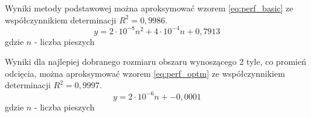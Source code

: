 \documentclass{article}
\begin{document}
 Wyniki metody podstawowej można aproksymować wzorem \ref{eq:perf_basic} ze współczynnikiem determinacji  $R^{2}=0,9986$.
\begin{equation}
\label{eq:perf_basic}
 y=2\cdot 10^{-8}n^{2}+4\cdot 10^{-4}n+0,7913
\end{equation}
gdzie $n$ - liczba pieszych

Wyniki dla najlepiej dobranego rozmiaru obszaru wynoszącego 2 tyle, co promień odcięcia, można aproksymować wzorem \ref{eq:perf_optm} ze współczynnikiem determinacji  $R^{2}=0,9997$.
\begin{equation}
\label{eq:perf_optm}
 y=2\cdot 10^{-6}n+-0,0001
\end{equation}
gdzie $n$ - liczba pieszych
\end{document}
